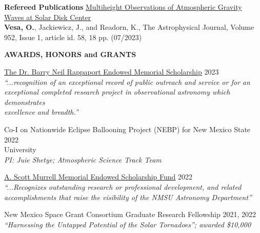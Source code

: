 \documentclass{resume} %
\begin{document}

\vspace{-0.1in}
\begin{rSection}{\textbf{Refereed Publications}}
\vspace{0.02in}
\href{https://iopscience.iop.org/article/10.3847/1538-4357/acd930}{Multiheight Observations of Atmospheric Gravity Waves at Solar Disk Center} \\ {\bf Vesa, O.}, Jackiewicz, J., and Readorn, K., The Astrophysical Journal, Volume 952, Issue 1, article id. 58, 18 pp. (07/2023)
\end{rSection} 


\vspace{-0.1in}
\begin{rSection}{\textbf{AWARDS, HONORS and GRANTS}}
\vspace{0.02in}

{\href{https://astro.nmsu.edu/fellowships/rappaport.html}{The Dr. Barry Neil Rappaport Endowed Memorial Scholarship}}
\hfill{2023} \\
\emph{``...recognition of an exceptional record of public outreach and service or for an \\ exceptional completed research project in observational astronomy which demonstrates \\ excellence and breadth.''}

{Co-I on Nationwide Eclipse Ballooning Project (NEBP) for New Mexico State \hfill{2022} \\ University} \\
\emph{PI: Juie Shetye;} \emph{Atmospheric Science Track Team}

{\href{https://astro.nmsu.edu/fellowships/murrell.html}{A. Scott Murrell Memorial Endowed Scholarship Fund}}
\hfill{2022} \\
\emph{``...Recognizes outstanding research or professional development, and related \\ accomplishments that raise the visibility of the NMSU Astronomy Department''}

{New Mexico Space Grant Consortium Graduate Research Fellowship } \hfill{2021, 2022} \\
\emph{``Harnessing the Untapped Potential of the Solar Tornadoes''; awarded \$10,000}
\end{rSection}
\newpage
\end{document}
